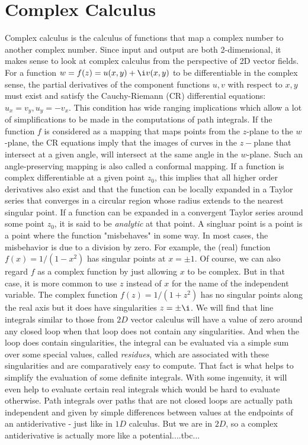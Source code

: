 \section{Complex Calculus}
Complex calculus is the calculus of functions that map a complex number to another complex number. Since input and output are both 2-dimensional, it makes sense to look at complex calculus from the perspective of 2D vector fields. For a function $w = f(z) = u(x,y) + \i v(x,y)$ to be differentiable in the complex sense, the partial derivatives of the component functions $u,v$ with respect to $x,y$ must exist and satisfy the Cauchy-Riemann (CR) differential equations: $u_x = v_y, u_y = -v_x$. This condition has wide ranging implications which allow a lot of simplifications to be made in the computations of path integrals. If the function $f$ is considered as a mapping that maps points from the $z$-plane to the $w$-plane, the CR equations imply that the images of curves in the $z-$plane that intersect at a given angle, will intersect at the same angle in the $w$-plane. Such an angle-preserving mapping is also called a conformal mapping. If a function is complex differentiable at a given point $z_0$, this implies that all higher order derivatives also exist and that the function can be locally expanded in a Taylor series that converges in a circular region whose radius extends to the nearest singular point. If a function can be expanded in a convergent Taylor series around some point $z_0$, it is said to be \emph{analytic} at that point. A singluar point is a point is a point where the function "misbehaves" in some way. In most cases, the misbehavior is due to a division by zero. For example, the (real) function $f(x) = 1 / (1 - x^2)$ has singular points at $x = \pm 1$. Of course, we can also regard $f$ as a complex function by just allowing $x$ to be complex. But in that case, it is more common to use $z$ instead of $x$ for the name of the independent variable. The complex function $f(z) = 1 / (1 + z^2)$ has no singular points along the real axis but it does have singularities $z = \pm \i$. We will find that line integrals similar to those from $2D$ vector calculus will have a value of zero around any closed loop when that loop does not contain any singularities. And when the loop does contain singularities, the integral can be evaluated via a simple sum over some special values, called \emph{residues}, which are associated with these singularities and are comparatively easy to compute. That fact is what helps to simplify the evaluation of some definite integrals. With some ingenuity, it will even help to evaluate certain real integrals which would be hard to evaluate otherwise. Path integrals over paths that are not closed loops are actually path independent and given by simple differences between values at the endpoints of an antiderivative - just like in $1D$ calculus. But we are in $2D$, so a complex antiderivative is actually more like a potential....tbc...


